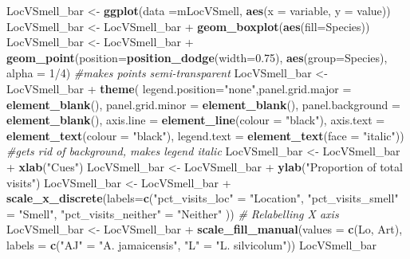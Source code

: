 \documentclass[]{article}
\newenvironment{Shaded}{\begin{snugshade}}{\end{snugshade}}
\newcommand{\KeywordTok}[1]{\textcolor[rgb]{0.13,0.29,0.53}{\textbf{{#1}}}}
\newcommand{\DataTypeTok}[1]{\textcolor[rgb]{0.13,0.29,0.53}{{#1}}}
\newcommand{\DecValTok}[1]{\textcolor[rgb]{0.00,0.00,0.81}{{#1}}}
\newcommand{\FloatTok}[1]{\textcolor[rgb]{0.00,0.00,0.81}{{#1}}}
\newcommand{\StringTok}[1]{\textcolor[rgb]{0.31,0.60,0.02}{{#1}}}
\newcommand{\CommentTok}[1]{\textcolor[rgb]{0.56,0.35,0.01}{\textit{{#1}}}}
\newcommand{\NormalTok}[1]{{#1}}
\begin{document}
\begin{Shaded}
\begin{Highlighting}[]
\NormalTok{LocVSmell_bar <-}\StringTok{ }\KeywordTok{ggplot}\NormalTok{(}\DataTypeTok{data =}\NormalTok{mLocVSmell, }\KeywordTok{aes}\NormalTok{(}\DataTypeTok{x =} \NormalTok{variable, }\DataTypeTok{y =} \NormalTok{value))}
\NormalTok{LocVSmell_bar <-}\StringTok{ }\NormalTok{LocVSmell_bar +}\StringTok{ }\KeywordTok{geom_boxplot}\NormalTok{(}\KeywordTok{aes}\NormalTok{(}\DataTypeTok{fill=}\NormalTok{Species))}
\NormalTok{LocVSmell_bar <-}\StringTok{ }\NormalTok{LocVSmell_bar +}\StringTok{ }\KeywordTok{geom_point}\NormalTok{(}\DataTypeTok{position=}\KeywordTok{position_dodge}\NormalTok{(}\DataTypeTok{width=}\FloatTok{0.75}\NormalTok{), }\KeywordTok{aes}\NormalTok{(}\DataTypeTok{group=}\NormalTok{Species), }\DataTypeTok{alpha =} \DecValTok{1}\NormalTok{/}\DecValTok{4}\NormalTok{) }\CommentTok{#makes points semi-transparent}
\NormalTok{LocVSmell_bar <-}\StringTok{ }\NormalTok{LocVSmell_bar +}\StringTok{  }\KeywordTok{theme}\NormalTok{( }\DataTypeTok{legend.position=}\StringTok{"none"}\NormalTok{,}\DataTypeTok{panel.grid.major =} \KeywordTok{element_blank}\NormalTok{(), }\DataTypeTok{panel.grid.minor =} \KeywordTok{element_blank}\NormalTok{(),}
\DataTypeTok{panel.background =} \KeywordTok{element_blank}\NormalTok{(), }\DataTypeTok{axis.line =} \KeywordTok{element_line}\NormalTok{(}\DataTypeTok{colour =} \StringTok{"black"}\NormalTok{), }\DataTypeTok{axis.text =} \KeywordTok{element_text}\NormalTok{(}\DataTypeTok{colour =} \StringTok{"black"}\NormalTok{), }\DataTypeTok{legend.text =} \KeywordTok{element_text}\NormalTok{(}\DataTypeTok{face =} \StringTok{"italic"}\NormalTok{))  }\CommentTok{#gets rid of background, makes legend italic}
\NormalTok{LocVSmell_bar <-}\StringTok{ }\NormalTok{LocVSmell_bar +}\StringTok{ }\KeywordTok{xlab}\NormalTok{(}\StringTok{"Cues"}\NormalTok{)}
\NormalTok{LocVSmell_bar <-}\StringTok{ }\NormalTok{LocVSmell_bar +}\StringTok{ }\KeywordTok{ylab}\NormalTok{(}\StringTok{"Proportion of total visits"}\NormalTok{)}
\NormalTok{LocVSmell_bar <-}\StringTok{ }\NormalTok{LocVSmell_bar +}\StringTok{ }\KeywordTok{scale_x_discrete}\NormalTok{(}\DataTypeTok{labels=}\KeywordTok{c}\NormalTok{(}\StringTok{"pct_visits_loc"} \NormalTok{=}\StringTok{ "Location"}\NormalTok{, }\StringTok{"pct_visits_smell"} \NormalTok{=}\StringTok{ "Smell"}\NormalTok{,}
                              \StringTok{"pct_visits_neither"} \NormalTok{=}\StringTok{ "Neither"} \NormalTok{))  }\CommentTok{# Relabelling X axis}
\NormalTok{LocVSmell_bar <-}\StringTok{ }\NormalTok{LocVSmell_bar +}\StringTok{  }\KeywordTok{scale_fill_manual}\NormalTok{(}\DataTypeTok{values =} \KeywordTok{c}\NormalTok{(Lo, Art), }\DataTypeTok{labels =} \KeywordTok{c}\NormalTok{(}\StringTok{"AJ"} \NormalTok{=}\StringTok{ "A. jamaicensis"}\NormalTok{, }\StringTok{"L"} \NormalTok{=}\StringTok{ "L. silvicolum"}\NormalTok{))}
\NormalTok{LocVSmell_bar}
\end{Highlighting}
\end{Shaded}
\end{document}
